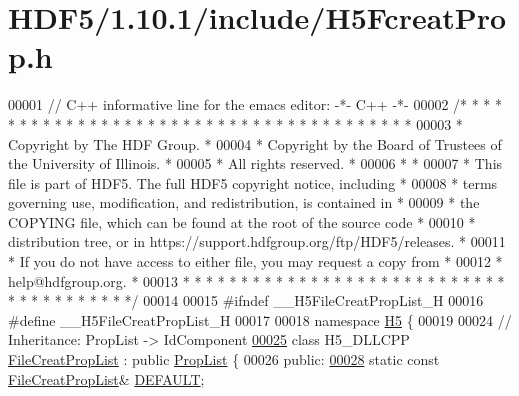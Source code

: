 \hypertarget{_h_d_f5_21_810_81_2include_2_h5_fcreat_prop_8h_source}{}\section{H\+D\+F5/1.10.1/include/\+H5\+Fcreat\+Prop.h}
\label{_h_d_f5_21_810_81_2include_2_h5_fcreat_prop_8h_source}

\begin{DoxyCode}
00001 \textcolor{comment}{// C++ informative line for the emacs editor: -*- C++ -*-}
00002 \textcolor{comment}{/* * * * * * * * * * * * * * * * * * * * * * * * * * * * * * * * * * * * * * *}
00003 \textcolor{comment}{ * Copyright by The HDF Group.                                               *}
00004 \textcolor{comment}{ * Copyright by the Board of Trustees of the University of Illinois.         *}
00005 \textcolor{comment}{ * All rights reserved.                                                      *}
00006 \textcolor{comment}{ *                                                                           *}
00007 \textcolor{comment}{ * This file is part of HDF5.  The full HDF5 copyright notice, including     *}
00008 \textcolor{comment}{ * terms governing use, modification, and redistribution, is contained in    *}
00009 \textcolor{comment}{ * the COPYING file, which can be found at the root of the source code       *}
00010 \textcolor{comment}{ * distribution tree, or in https://support.hdfgroup.org/ftp/HDF5/releases.  *}
00011 \textcolor{comment}{ * If you do not have access to either file, you may request a copy from     *}
00012 \textcolor{comment}{ * help@hdfgroup.org.                                                        *}
00013 \textcolor{comment}{ * * * * * * * * * * * * * * * * * * * * * * * * * * * * * * * * * * * * * * */}
00014 
00015 \textcolor{preprocessor}{#ifndef \_\_H5FileCreatPropList\_H}
00016 \textcolor{preprocessor}{#define \_\_H5FileCreatPropList\_H}
00017 
00018 \textcolor{keyword}{namespace }\hyperlink{namespace_h5}{H5} \{
00019 
00024 \textcolor{comment}{//  Inheritance: PropList -> IdComponent}
\hyperlink{class_h5_1_1_file_creat_prop_list}{00025} \textcolor{keyword}{class }H5\_DLLCPP \hyperlink{class_h5_1_1_file_creat_prop_list}{FileCreatPropList} : \textcolor{keyword}{public} \hyperlink{class_h5_1_1_prop_list}{PropList} \{
00026    \textcolor{keyword}{public}:
\hyperlink{class_h5_1_1_file_creat_prop_list_a4913710830a8ec38fbbda805074377d4}{00028}         \textcolor{keyword}{static} \textcolor{keyword}{const} \hyperlink{class_h5_1_1_file_creat_prop_list}{FileCreatPropList}& \hyperlink{class_h5_1_1_file_creat_prop_list_a4913710830a8ec38fbbda805074377d4}{DEFAULT};

\end{DoxyCode}
